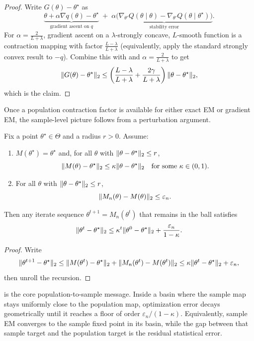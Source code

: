 \documentclass[11pt]{article}
\begin{document}
\begin{proof}
Write $G(\theta)-\theta^\star$ as
\[
\underbrace{\theta + \alpha \nabla q(\theta)-\theta^\star}_{\text{gradient ascent on $q$}}
\;+\;
\alpha\underbrace{\bigl(\nabla_{\theta'} Q(\theta\mid\theta)-\nabla_{\theta'} Q(\theta\mid\theta^\star)\bigr)}_{\text{stability error}}.
\]
For $\alpha=\frac{2}{L+\lambda}$, gradient ascent on a $\lambda$-strongly concave, $L$-smooth function is a contraction mapping with factor $\frac{L-\lambda}{L+\lambda}$ (equivalently, apply the standard strongly convex result to $-q$).
Combine this with  and $\alpha=\frac{2}{L+\lambda}$ to get
\[
\lVert G(\theta)-\theta^\star\rVert_2
\le
\left(\frac{L-\lambda}{L+\lambda} + \frac{2\gamma}{L+\lambda}\right)\lVert\theta-\theta^\star\rVert_2,
\]
which is the claim.
\end{proof}

Once a population contraction factor is available for either exact EM or gradient EM, the sample-level picture follows from a perturbation argument.

\begin{lemma}
\label{lem:contraction-perturbation}
Fix a point $\theta^\star\in\Theta$ and a radius $r>0$.
Assume:
\begin{enumerate}[leftmargin=*]
  \item $M(\theta^\star)=\theta^\star$ and, for all $\theta$ with $\lVert\theta-\theta^\star\rVert_2\le r$,
  \[
  \lVert M(\theta)-\theta^\star\rVert_2 \le \kappa \lVert\theta-\theta^\star\rVert_2
  \quad\text{for some }\kappa\in(0,1).
  \]
  \item For all $\theta$ with $\lVert\theta-\theta^\star\rVert_2\le r$,
  \[
  \lVert M_n(\theta)-M(\theta)\rVert_2 \le \varepsilon_n.
  \]
\end{enumerate}
Then any iterate sequence $\theta^{t+1}=M_n(\theta^t)$ that remains in the ball satisfies
\[
\lVert\theta^t-\theta^\star\rVert_2
\le
\kappa^t \lVert\theta^0-\theta^\star\rVert_2 + \frac{\varepsilon_n}{1-\kappa}.
\]
\end{lemma}

\begin{proof}
Write
\[
\lVert\theta^{t+1}-\theta^\star\rVert_2
\le
\lVert M(\theta^t)-\theta^\star\rVert_2 + \lVert M_n(\theta^t)-M(\theta^t)\rVert_2
\le
\kappa\lVert\theta^t-\theta^\star\rVert_2 + \varepsilon_n,
\]
then unroll the recursion.
\end{proof}

 is the core population-to-sample message.
Inside a basin where the sample map stays uniformly close to the population map, optimization error decays geometrically until it reaches a floor of order $\varepsilon_n/(1-\kappa)$.
Equivalently, sample EM converges to the sample fixed point in its basin, while the gap between that sample target and the population target is the residual statistical error.
\end{document}
